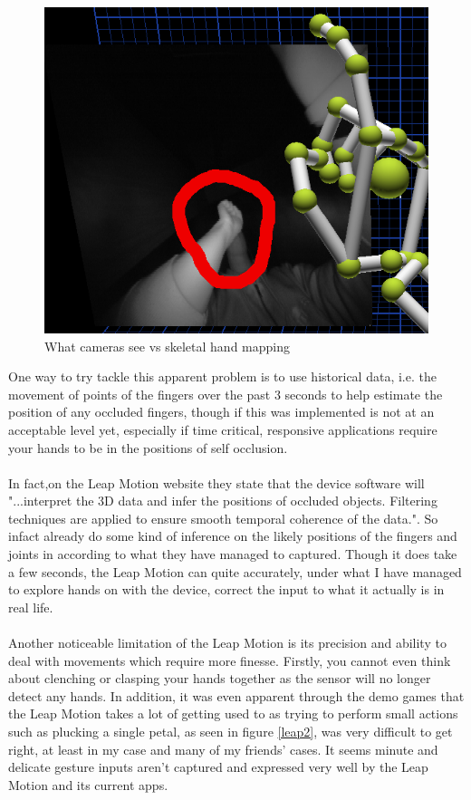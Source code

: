 \documentclass[11pt]{report}
\begin{document}
\begin{center}
	\begin{figure}[H]
		\begin{center}
			\includegraphics[scale=0.45]{pics/LeapMotion1}
			\caption{What cameras see vs skeletal hand mapping}
			\label{LeapMotion1}
		\end{center}
	\end{figure}
\end{center}

One way to try tackle this apparent problem is to use historical data, i.e.
the movement of points of the fingers over the past 3 seconds to help estimate
the position of any occluded fingers, though if this was implemented is not
at an acceptable level yet, especially if time critical, responsive 
applications require your hands to be in the positions of self occlusion. 
\\ \\
In fact,on the Leap Motion website they state that the device software will
"...interpret the 3D data and infer the positions of occluded objects. Filtering 
techniques are applied to ensure smooth temporal coherence of the data.". So infact
already do some kind of inference on the likely positions of the fingers and joints
in according to what they have managed to captured. Though it does take a few seconds,
the Leap Motion can quite accurately, under what I have managed to explore hands on with
the device, correct the input to what it actually is in real life.
\\ \\
Another noticeable limitation of the Leap Motion is its precision and ability to
deal with movements which require more finesse. Firstly, you cannot even think about
clenching or clasping your hands together as the sensor will no longer detect any hands.
In addition, it was even apparent through the demo games that the Leap Motion takes a lot
of getting used to as trying to perform small actions such as plucking a single petal,
as seen in figure \ref{leap2}, was very difficult to get right, at least in my case
and many of my friends' cases. It seems minute and delicate gesture inputs aren't captured 
and expressed very well by the Leap Motion and its current apps.
\end{document}
